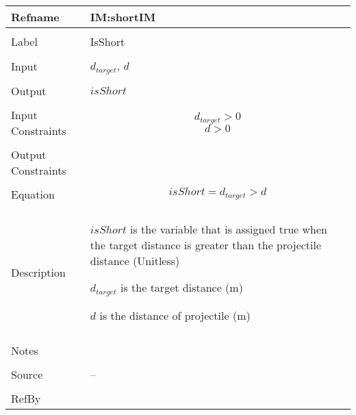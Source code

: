 \documentclass[12pt]{article}
\begin{document}
\noindent \begin{minipage}{\textwidth}
\begin{tabular}{p{} p{}}
\toprule \textbf{Refname} & \textbf{IM:shortIM}
\label{IM:shortIM}
\\ \midrule \\
Label & IsShort
\\ \midrule \\
Input & ${d_{target}}$, $d$
\\ \midrule \\
Output & $isShort$
\\ \midrule \\
Input Constraints & \begin{displaymath}
                    {d_{target}}>0
                    \end{displaymath}
                    \begin{displaymath}
                    d>0
                    \end{displaymath}
\\ \midrule \\
Output Constraints & 
\\ \midrule \\
Equation & \begin{displaymath}
           isShort={d_{target}}>d
           \end{displaymath}
\\ \midrule \\
Description & \begin{symbDescription}
              \item{$isShort$ is the variable that is assigned true when the target distance is greater than the projectile distance (Unitless)}
              \item{${d_{target}}$ is the target distance (m)}
              \item{$d$ is the distance of projectile (m)}
              \end{symbDescription}
\\ \midrule \\
Notes & 
\\ \midrule \\
Source & --
\\ \midrule \\
RefBy & 
\\ \bottomrule \end{tabular}
\end{minipage}
\par~
\end{document}
